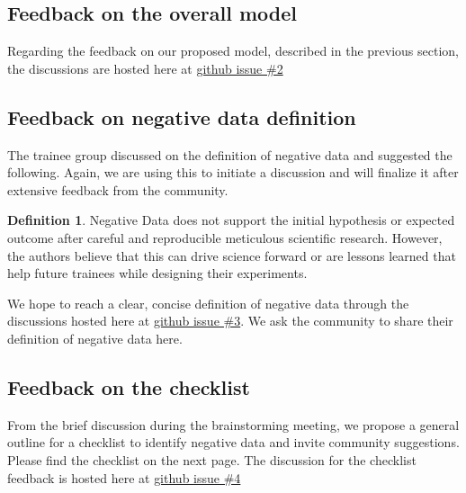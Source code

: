 \documentclass[9pt,lessons]{livecoms}
\theoremstyle{definition}
\newtheorem{definition}{Definition}[section]
\theoremstyle{remark}
\begin{document}
\subsection {Feedback on the overall model}
Regarding the feedback on our proposed model, described in the previous section, the discussions are hosted here at \href{https://github.com/Poruthoor/NegativeDataInitiative/issues/2}{github issue \#2}

\subsection {Feedback on negative data definition}
The trainee group discussed on the definition of negative data and suggested the following.
Again, we are using this to initiate a discussion and will finalize it after extensive feedback from the community.

\begin{definition}
Negative Data does not support the initial hypothesis or expected outcome after careful and reproducible meticulous scientific research.
However, the authors believe that this can drive science forward or are lessons learned that help future trainees while designing their experiments.  
\end{definition}

We hope to reach a clear, concise definition of negative data through the discussions hosted here at \href{https://github.com/Poruthoor/NegativeDataInitiative/issues/3}{github issue \#3}.
We ask the community to share their definition of negative data here.

\subsection{Feedback on the checklist}

From the brief discussion during the brainstorming meeting, we propose a general outline for a checklist to identify negative data and invite community suggestions.
Please find the checklist on the next page.
The discussion for the checklist feedback is hosted here at \href{https://github.com/Poruthoor/NegativeDataInitiative/issues/4}{github issue \#4}
\end{document}
